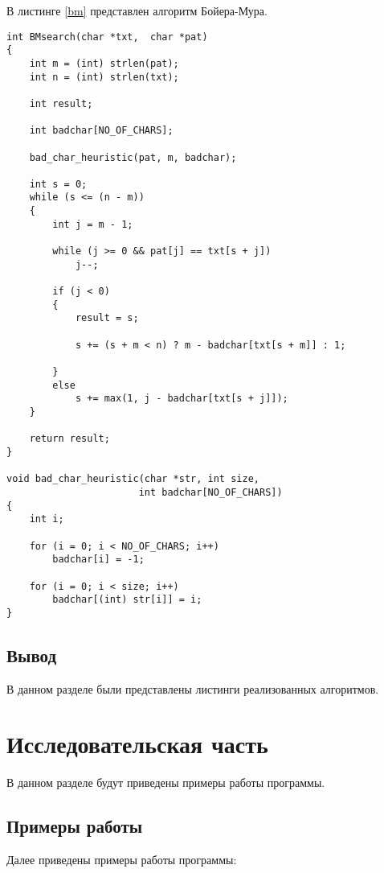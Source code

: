 \documentclass[a4paper, 14pt]{article}
\begin{document}
\newpage
	В листинге \ref{bm} представлен алгоритм Бойера-Мура.\\

\begin{lstlisting}[label=bm,caption=Алгоритм Бойера-Мура]
int BMsearch(char *txt,  char *pat)
{
    int m = (int) strlen(pat);
    int n = (int) strlen(txt);

    int result;

    int badchar[NO_OF_CHARS];

    bad_char_heuristic(pat, m, badchar);

    int s = 0; 
    while (s <= (n - m))
    {
        int j = m - 1;

        while (j >= 0 && pat[j] == txt[s + j])
            j--;

        if (j < 0)
        {
            result = s;

            s += (s + m < n) ? m - badchar[txt[s + m]] : 1;

        }
        else
            s += max(1, j - badchar[txt[s + j]]);
    }

    return result;
}

void bad_char_heuristic(char *str, int size,
                       int badchar[NO_OF_CHARS])
{
    int i;

    for (i = 0; i < NO_OF_CHARS; i++)
        badchar[i] = -1;

    for (i = 0; i < size; i++)
        badchar[(int) str[i]] = i;
}
\end{lstlisting}

	\subsection{Вывод}

В данном разделе были представлены листинги реализованных алгоритмов.

\newpage
	\section{Исследовательская часть}
	В данном разделе будут приведены примеры работы программы.\\

	\subsection{Примеры работы}
	
	Далее приведены примеры работы программы:
	
\end{document}
